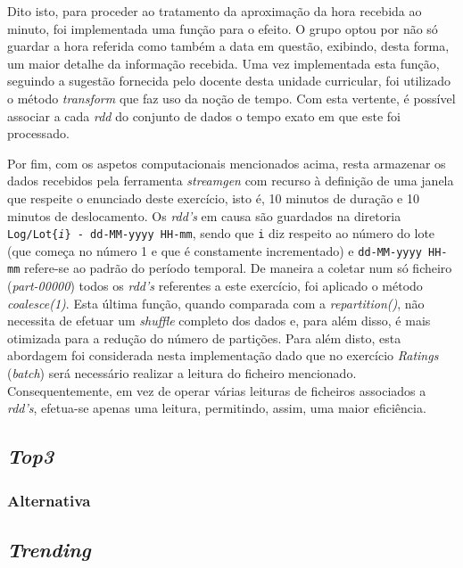 \documentclass[a4paper]{report}
\begin{document}
        Dito isto, para proceder ao tratamento da aproximação da hora recebida ao minuto, foi implementada uma função para o efeito. O grupo optou por não só guardar a hora referida como também a data em questão, exibindo, desta forma, um maior detalhe da informação recebida.
        Uma vez implementada esta função, seguindo a sugestão fornecida pelo docente desta unidade curricular, foi utilizado o método \textit{transform} que faz uso da noção de tempo. Com esta vertente, é possível associar a cada \textit{rdd} do conjunto de dados o tempo exato em que este foi processado.

        Por fim, com os aspetos computacionais mencionados acima, resta armazenar os dados recebidos pela ferramenta \textit{streamgen} com recurso à definição de uma janela que respeite o enunciado deste exercício, isto é, 10 minutos de duração e 10 minutos de deslocamento.
        Os \textit{rdd's} em causa são guardados na diretoria \texttt{Log/Lot\{\textit{i}\} - dd-MM-yyyy HH-mm}, sendo que \texttt{i} diz respeito ao número do lote (que começa no número 1 e que é constamente incrementado) e \texttt{dd-MM-yyyy HH-mm} refere-se ao padrão do período temporal.
        De maneira a coletar num só ficheiro (\textit{part-00000}) todos os \textit{rdd's} referentes a este exercício, foi aplicado o método \textit{coalesce(1)}.
        Esta última função, quando comparada com a \textit{repartition()}, não necessita de efetuar um \textit{shuffle} completo dos dados e, para além disso, é mais otimizada para a redução do número de partições.
        Para além disto, esta abordagem foi considerada nesta implementação dado que no exercício \textit{Ratings} (\textit{batch}) será necessário realizar a leitura do ficheiro mencionado. Consequentemente, em vez de operar várias leituras de ficheiros associados a \textit{rdd's}, efetua-se apenas uma leitura, permitindo, assim, uma maior eficiência.

        \subsection{\textit{Top3}} \label{subsec:Task1-Top3}
            \subsubsection{Alternativa} \label{sssec:Task1-Top3-Alternativa} 

        \subsection{\textit{Trending}} \label{subsec:Task1-Trending}
\end{document}
